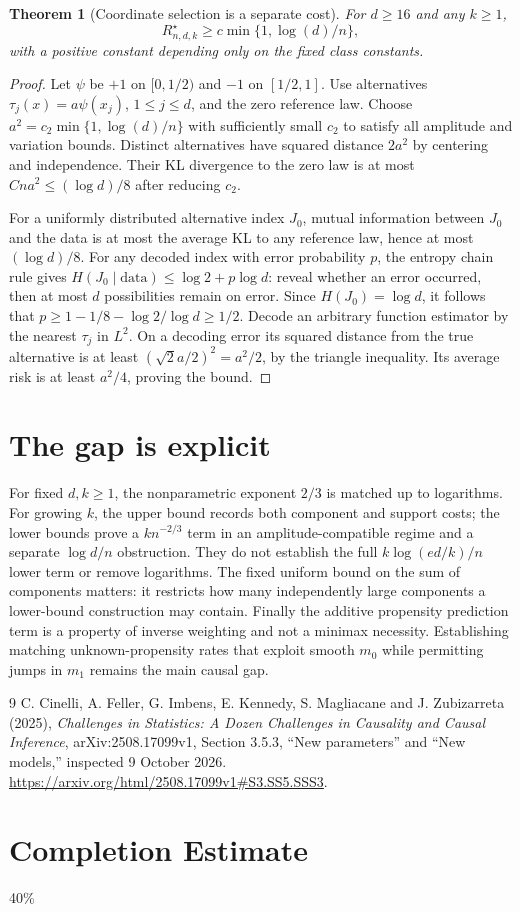 \documentclass[11pt]{article}
\newtheorem{theorem}{Theorem}
\theoremstyle{remark}
\begin{document}
\begin{theorem}[Coordinate selection is a separate cost]\label{selection}
For $d\geq16$ and any $k\geq1$,
\[
               R_{n,d,k}^\star\geq c\min\{1,\log(d)/n\},
\]
with a positive constant depending only on the fixed class constants.
\end{theorem}
\begin{proof}
Let $\psi$ be $+1$ on $[0,1/2)$ and $-1$ on $[1/2,1]$.
Use alternatives $\tau_j(x)=a\psi(x_j)$, $1\leq j\leq d$, and the zero reference law. Choose
$a^2=c_2\min\{1,\log(d)/n\}$ with sufficiently small $c_2$ to satisfy all amplitude and variation bounds. Distinct alternatives have squared distance $2a^2$ by centering and independence. Their KL divergence to the zero law is at most $Cna^2\leq(\log d)/8$ after reducing $c_2$.

For a uniformly distributed alternative index $J_0$, mutual information between $J_0$ and the data is at most the average KL to any reference law, hence at most $(\log d)/8$. For any decoded index with error probability $p$, the entropy chain rule gives
$H(J_0\mid\text{data})\leq\log2+p\log d$: reveal whether an error occurred, then at most $d$ possibilities remain on error. Since $H(J_0)=\log d$, it follows that
$p\geq1-1/8-\log2/\log d\geq1/2$.
Decode an arbitrary function estimator by the nearest $\tau_j$ in $L^2$. On a decoding error its squared distance from the true alternative is at least $(\sqrt{2}a/2)^2=a^2/2$, by the triangle inequality. Its average risk is at least $a^2/4$, proving the bound.
\end{proof}

\section{The gap is explicit}
For fixed $d,k\geq1$, the nonparametric exponent $2/3$ is matched up to logarithms. For growing $k$, the upper bound records both component and support costs; the lower bounds prove a $kn^{-2/3}$ term in an amplitude-compatible regime and a separate $\log d/n$ obstruction. They do not establish the full $k\log(ed/k)/n$ lower term or remove logarithms. The fixed uniform bound on the sum of components matters: it restricts how many independently large components a lower-bound construction may contain. Finally the additive propensity prediction term is a property of inverse weighting and not a minimax necessity. Establishing matching unknown-propensity rates that exploit smooth $m_0$ while permitting jumps in $m_1$ remains the main causal gap.

\begin{thebibliography}{9}
 C. Cinelli, A. Feller, G. Imbens, E. Kennedy, S. Magliacane and J. Zubizarreta (2025), \emph{Challenges in Statistics: A Dozen Challenges in Causality and Causal Inference}, arXiv:2508.17099v1, Section 3.5.3, ``New parameters'' and ``New models,'' inspected 9 October 2026. \url{https://arxiv.org/html/2508.17099v1#S3.SS5.SSS3}.
\end{thebibliography}

\section{Completion Estimate}
40\%
\end{document}
